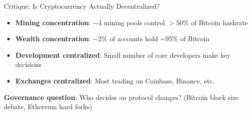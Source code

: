 ﻿\documentclass[aspectratio=169,11pt]{beamer}
\begin{document}
\begin{frame}{Critique: Is Cryptocurrency Actually Decentralized?}
\begin{objectionbox}
\small
\begin{itemize}
    \item \textbf{Mining concentration}: $\sim$4 mining pools control $>$50\% of Bitcoin hashrate
    \item \textbf{Wealth concentration}: $\sim$2\% of accounts hold $\sim$95\% of Bitcoin
    \item \textbf{Development centralized}: Small number of core developers make key decisions
    \item \textbf{Exchanges centralized}: Most trading on Coinbase, Binance, etc.
\end{itemize}
\end{objectionbox}

\vspace{0.2em}
\begin{center}
\end{center}
\vspace{-0.3em}
\textbf{Governance question}: Who decides on protocol changes? (Bitcoin block size debate, Ethereum hard forks)
\end{frame}
\end{document}
